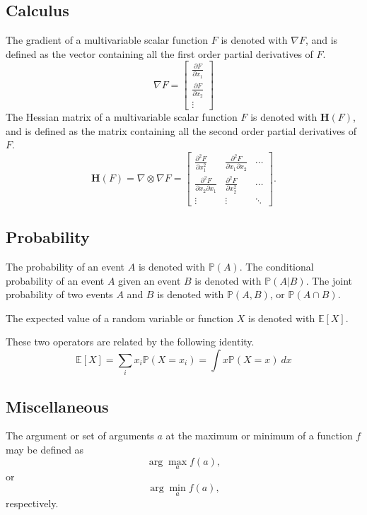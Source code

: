 \documentclass[12pt]{report}
\theoremstyle{definition}
\theoremstyle{remark}
\begin{document}
\subsection{Calculus}
The gradient of a multivariable scalar function $F$ is denoted with $\nabla F$, and is defined as the vector containing all the first order partial derivatives of $F$.
\begin{equation}
    \nabla F = \begin{bmatrix}
        \frac{\partial F}{\partial x_1} \\
        \frac{\partial F}{\partial x_2} \\
        \vdots
    \end{bmatrix}
\end{equation}
The Hessian matrix of a multivariable scalar function $F$ is denoted with $\mathbf{H}(F)$, and is defined as the matrix containing all the second order partial derivatives of $F$.
\begin{equation}
    \mathbf{H}(F) = \nabla \otimes \nabla F =
    \begin{bmatrix}
        \frac{\partial^2 F}{\partial x_1^2} & \frac{\partial^2 F}{\partial x_1 \partial x_2} & \cdots \\
        \frac{\partial^2 F}{\partial x_2 \partial x_1} & \frac{\partial^2 F}{\partial x_2^2} & \cdots \\
        \vdots & \vdots & \ddots
    \end{bmatrix}.
\end{equation}

\subsection{Probability}
The probability of an event $A$ is denoted with $\mathbb{P}(A)$. The conditional probability of an event $A$ given an event $B$ is denoted with $\mathbb{P}(A|B)$. The joint probability of two events $A$ and $B$ is denoted with $\mathbb{P}(A,B)$, or $\mathbb{P}(A \cap B)$.

The expected value of a random variable or function $X$ is denoted with $\mathbb{E}[X]$.

These two operators are related by the following identity.
\begin{equation}
    \mathbb{E}[X] = \sum_i x_i \mathbb{P}(X=x_i) = \int x\mathbb{P}(X=x)\ dx
\end{equation}

\subsection{Miscellaneous}
The argument or set of arguments $a$ at the maximum or minimum of a function $f$ may be defined as
\begin{equation}
    \arg\max_a f(a),
\end{equation}
or
\begin{equation}
    \arg\min_a f(a),
\end{equation}
respectively.
\end{document}
